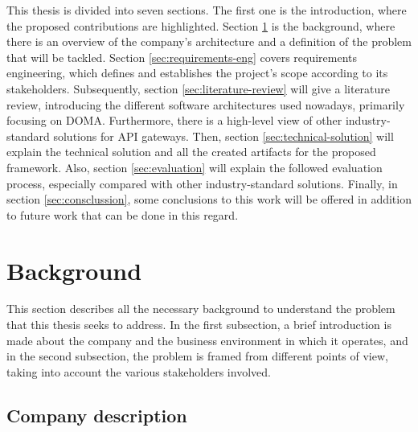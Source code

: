 \documentclass[english, 12pt, a4paper, sci, utf8, a-1b, online]{aaltothesis}
\begin{document}
This thesis is divided into seven sections. The first one is the introduction, where the proposed contributions are highlighted. Section \ref{sec:background} is the background, where there is an overview of the company's architecture and a definition of the problem that will be tackled. Section \ref{sec:requirements-eng} covers requirements engineering, which defines and establishes the project's scope according to its stakeholders. Subsequently, section \ref{sec:literature-review} will give a literature review, introducing the different software architectures used nowadays, primarily focusing on DOMA. Furthermore, there is a high-level view of other industry-standard solutions for API gateways. Then, section \ref{sec:technical-solution} will explain the technical solution and all the created artifacts for the proposed framework. Also, section \ref{sec:evaluation} will explain the followed evaluation process, especially compared with other industry-standard solutions. Finally, in section \ref{sec:consclussion}, some conclusions to this work will be offered in addition to future work that can be done in this regard.


\thispagestyle{empty}

\clearpage
\section{Background}
\label{sec:background}


This section describes all the necessary background to understand the problem that this thesis seeks to address. In the first subsection, a brief introduction is made about the company and the business environment in which it operates, and in the second subsection, the problem is framed from different points of view, taking into account the various stakeholders involved.

\subsection{Company description}

\end{document}
